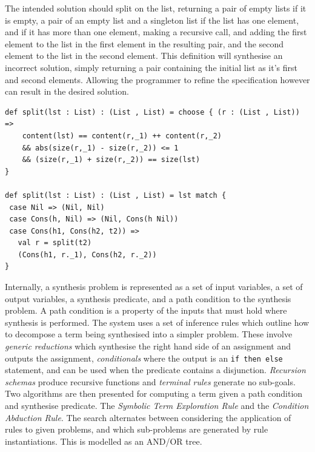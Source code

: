 \documentclass[a4paper]{article}
\begin{document}
The intended solution should split on the list, returning a pair
of empty lists if it is empty, a pair of an empty list and a singleton
list if the list has one element, and if it has more than one element,
making a recursive call, and adding the first element to the list
in the first element in the resulting pair, and the second element to the list in the
second element. 
This definition will synthesise an incorrect solution, simply returning
a pair containing the initial list as it's first and second elements. 
Allowing the programmer to refine the specification however can result in the 
desired solution.

\begin{center}
\begin{verbatim}
def split(lst : List) : (List , List) = choose { (r : (List , List)) => 
	content(lst) == content(r,_1) ++ content(r,_2)
	&& abs(size(r,_1) - size(r,_2)) <= 1
	&& (size(r,_1) + size(r,_2)) == size(lst)
}

def split(lst : List) : (List , List) = lst match {
 case Nil => (Nil, Nil)
 case Cons(h, Nil) => (Nil, Cons(h Nil))
 case Cons(h1, Cons(h2, t2)) =>
   val r = split(t2)
   (Cons(h1, r._1), Cons(h2, r._2))
}
\end{verbatim}
\end{center}

Internally, a synthesis problem is represented as a set of input variables, a set of output variables,
a synthesis predicate, and a path condition to the synthesis problem. A path condition is a property of the inputs that must 
hold where synthesis is performed. The system uses a 
set of inference rules which outline how to decompose a term being synthesised into a simpler problem. These involve 
\emph{generic reductions} which synthesise the right hand side of an assignment and outputs the assignment, \emph{conditionals} 
where the output is an \texttt{if then else} statement, and can be used when the predicate contains a disjunction. \emph{Recursion schemas}
produce recursive functions and \emph{terminal rules} generate no sub-goals. Two algorithms are then presented for computing a 
term given a path condition and synthesise predicate. The \emph{Symbolic Term Exploration Rule} and the \emph{Condition Abduction Rule}.
The search alternates between considering the application of rules to given problems, and which sub-problems are generated 
by rule instantiations. This is modelled as an AND/OR tree.
\end{document}
